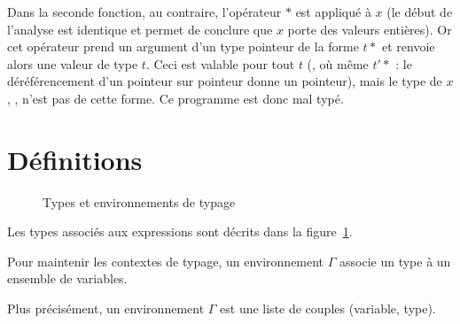 Dans la seconde fonction, au contraire, l'opérateur $*$ est appliqué à $x$ (le
début de l'analyse est identique et permet de conclure que $x$ porte des valeurs
entières). Or cet opérateur prend un argument d'un type pointeur de la forme
$t*$ et renvoie alors une valeur de type $t$. Ceci est valable pour tout $t$
(\tInt, \tFloat où même $t'*$ : le déréférencement d'un pointeur sur pointeur
donne un pointeur), mais le type de $x$, \tInt, n'est pas de cette forme. Ce
programme est donc mal typé.

\section{Définitions}

\begin{figure}



  \caption{Types et environnements de typage}

  \label{fig:les-types}

\end{figure}

Les types associés aux expressions sont décrits dans la
figure~\ref{fig:les-types}.

Pour maintenir les contextes de typage, un environnement $Γ$ associe un type à
un ensemble de variables.

Plus précisément, un environnement $Γ$ est une liste de couples (variable,
type).

